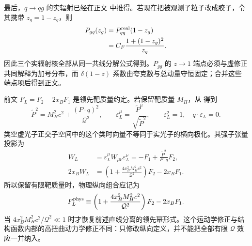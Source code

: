 \begin{derivation}[最低阶部分子分裂核]
最后，$q\to qg$ 的实辐射已经在正文 中推得。若现在把被观测子粒子改成胶子，令其携带 $z_g=1-z_q$，则
\begin{align*}
 P_{gq}(z_g)
 &=P_{qq}^{\rm real}(1-z_g)\\
 &=C_F\frac{1+(1-z_g)^2}{z_g}.
\end{align*}
因此三个实辐射核全部从同一共线分解公式得到。$P_{gg}$ 的 $z\to1$ 端点必须与虚修正共同解释为加号分布，而 $\delta(1-z)$ 系数由夸克数与总动量守恒固定；合并这些端点项后得到正文。
\end{derivation}

\begin{derivation}[有限靶质量的纵向投影]
前文 $F_L=F_2-2x_BF_1$ 是领先靶质量约定。若保留靶质量 $M_H$，从 得到
\begin{equation*}
 \widetilde P^2=M_H^2c^2+\frac{(P\cdot q)^2}{\mathcal Q^2},\qquad
 \varepsilon_L^\mu=\frac{\widetilde P^\mu}{\sqrt{\widetilde P^2}},\qquad
 \varepsilon_L^2=1,\quad q\cdot\varepsilon_L=0.
\end{equation*}
类空虚光子正交子空间中的这个类时向量不等同于实光子的横向极化。其强子张量投影为
\begin{align*}
 W_L&=\varepsilon_L^\mu W_{\mu\nu}\varepsilon_L^\nu
 =-F_1+\frac{\widetilde P^2}{P\cdot q}F_2,\\
 2x_BW_L&=\left(1+\frac{4x_B^2M_H^2c^2}{\mathcal Q^2}\right)F_2-2x_BF_1.
\end{align*}
所以保留有限靶质量时，物理纵向组合应记为
\begin{equation}
 F_L^{\rm phys}\equiv
 \left(1+\frac{4x_B^2M_H^2c^2}{\mathcal Q^2}\right)F_2-2x_BF_1.
 \label{eq:dis-longitudinal-target-mass}
\end{equation}
当 $4x_B^2M_H^2c^2/\mathcal Q^2\ll1$ 时才恢复前述直线分离的领先幂形式。这个运动学修正与结构函数内部的高扭曲动力学修正不同：只修改纵向定义，并不能把全部有限 $\mathcal Q$ 效应一并纳入。
\end{derivation}

